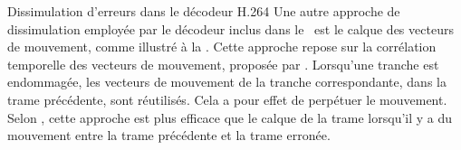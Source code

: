 \begin{section}{Dissimulation d'erreurs dans le décodeur H.264}
Une autre approche de dissimulation employée par le décodeur inclus dans le
\ltCodec~est le calque des vecteurs de mouvement, comme illustré à la
. Cette approche repose sur la corrélation temporelle des
vecteurs de mouvement, proposée par \citet{Wu2006}. Lorsqu'une tranche est
endommagée, les vecteurs de mouvement de la tranche correspondante, dans la
trame précédente, sont réutilisés. Cela a pour effet de perpétuer le
mouvement. Selon \citeauthor{Wu2006}, cette approche est plus efficace que le
calque de la trame lorsqu'il y a du mouvement entre la trame précédente et la
trame erronée.

\begin{figure}
\end{figure}
\end{section}
